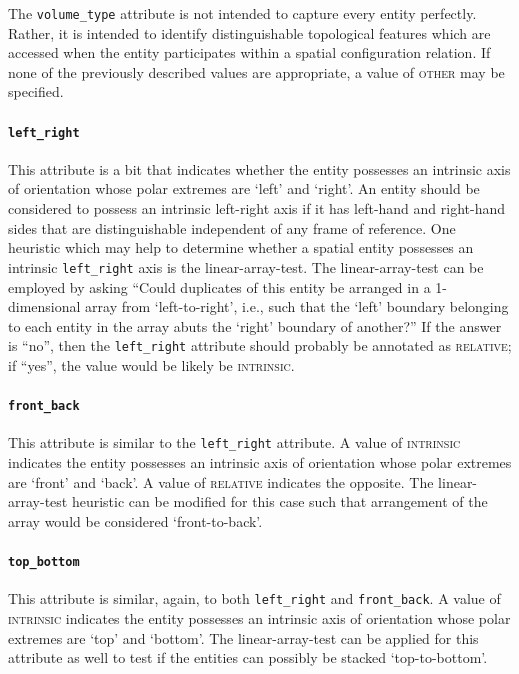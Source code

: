 \documentclass[11pt]{article}
\begin{document}
The \texttt{volume\_type} attribute is not intended to capture every entity perfectly. Rather, it is intended to identify distinguishable topological features which are accessed when the entity participates within a spatial configuration relation. If none of the previously described values are appropriate, a value of \textsc{other} may be specified.

\paragraph{\texttt{left\_right}} %
\label{par:left_right}
This attribute is a bit that indicates whether the entity possesses an intrinsic axis of orientation whose polar extremes are `left' and `right'. An entity should be considered to possess an intrinsic left-right axis if it has left-hand and right-hand sides that are distinguishable independent of any frame of reference. One heuristic which may help to determine whether a spatial entity possesses an intrinsic \texttt{left\_right} axis is the linear-array-test. The linear-array-test can be employed by asking ``Could duplicates of this entity be arranged in a 1-dimensional array from `left-to-right', i.e., such that the `left' boundary belonging to each entity in the array abuts the `right' boundary of another?'' If the answer is ``no'', then the \texttt{left\_right} attribute should probably be annotated as \textsc{relative}; if ``yes'', the value would be likely be \textsc{intrinsic}.

\paragraph{\texttt{front\_back}} %
\label{par:front_back}
This attribute is similar to the \texttt{left\_right} attribute. A value of \textsc{intrinsic} indicates the entity possesses an intrinsic axis of orientation whose polar extremes are `front' and `back'. A value of \textsc{relative} indicates the opposite. The linear-array-test heuristic can be modified for this case such that arrangement of the array would be considered `front-to-back'.

\paragraph{\texttt{top\_bottom}} %
\label{par:top_bottom}
This attribute is similar, again, to both \texttt{left\_right} and \texttt{front\_back}. A value of \textsc{intrinsic} indicates the entity possesses an intrinsic axis of orientation whose polar extremes are `top' and `bottom'. The linear-array-test can be applied for this attribute as well to test if the entities can possibly be stacked `top-to-bottom'.
\end{document}
